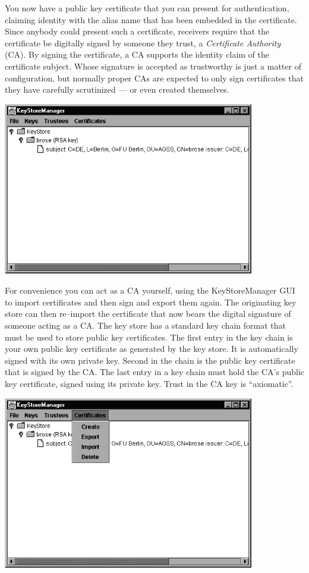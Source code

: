 You  now  have a  public  key certificate  that  you  can present  for
authentication, claiming  identity with the  alias name that  has been
embedded  in the  certificate.   Since anybody  could  present such  a
certificate,  receivers  require  that  the certificate  be  digitally
signed by someone  they trust, a {\em Certificate  Authority} (CA). By
signing  the certificate,  a CA  supports  the identity  claim of  the
certificate  subject. Whose  signature is  accepted as  trustworthy is
just a matter  of configuration, but normally proper  CAs are expected
to only sign certificates that  they have carefully scrutinized --- or
even created themselves.

\bigskip
\centerline{\includegraphics[width=11cm]{SSL/Keystore}}

For   convenience  you   can  act   as  a   CA  yourself,   using  the
KeyStoreManager GUI  to import certificates  and then sign  and export
them  again.   The  originating  key  store can  then  re--import  the
certificate that now bears the  digital signature of someone acting as
a CA. The key store has a  standard key chain format that must be used
to store public key certificates. The  first entry in the key chain is
your own public  key certificate as generated by the  key store. It is
automatically signed with its own  private key. Second in the chain is
the public key certificate that is signed by the CA. The last entry in
a key  chain must hold the  CA's public key  certificate, signed using
its private key. Trust in the CA key is ``axiomatic''.

\bigskip
\centerline{\includegraphics[width=11cm]{SSL/KSMenu}}

